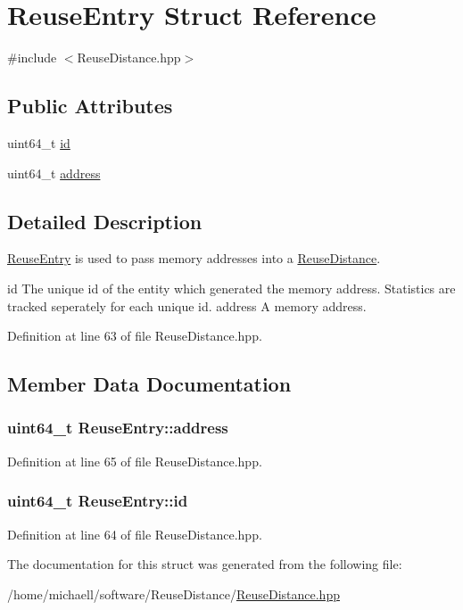 \hypertarget{struct_reuse_entry}{
\section{ReuseEntry Struct Reference}
\label{struct_reuse_entry}
}


{\ttfamily \#include $<$ReuseDistance.hpp$>$}\subsection*{Public Attributes}
\begin{DoxyCompactItemize}
\item 
uint64\_\-t \hyperlink{struct_reuse_entry_ab30e9a6fae29a6453f5fa2245e441f3a}{id}
\item 
uint64\_\-t \hyperlink{struct_reuse_entry_a40bd37796c5f75438f28f5b6d090a432}{address}
\end{DoxyCompactItemize}


\subsection{Detailed Description}
\hyperlink{struct_reuse_entry}{ReuseEntry} is used to pass memory addresses into a \hyperlink{class_reuse_distance}{ReuseDistance}.

id The unique id of the entity which generated the memory address. Statistics are tracked seperately for each unique id.  address A memory address. 

Definition at line 63 of file ReuseDistance.hpp.

\subsection{Member Data Documentation}
\hypertarget{struct_reuse_entry_a40bd37796c5f75438f28f5b6d090a432}{
\subsubsection[{address}]{\setlength{\rightskip}{0pt plus 5cm}uint64\_\-t {\bf ReuseEntry::address}}}
\label{struct_reuse_entry_a40bd37796c5f75438f28f5b6d090a432}


Definition at line 65 of file ReuseDistance.hpp.\hypertarget{struct_reuse_entry_ab30e9a6fae29a6453f5fa2245e441f3a}{
\subsubsection[{id}]{\setlength{\rightskip}{0pt plus 5cm}uint64\_\-t {\bf ReuseEntry::id}}}
\label{struct_reuse_entry_ab30e9a6fae29a6453f5fa2245e441f3a}


Definition at line 64 of file ReuseDistance.hpp.

The documentation for this struct was generated from the following file:\begin{DoxyCompactItemize}
\item 
/home/michaell/software/ReuseDistance/\hyperlink{_reuse_distance_8hpp}{ReuseDistance.hpp}\end{DoxyCompactItemize}

